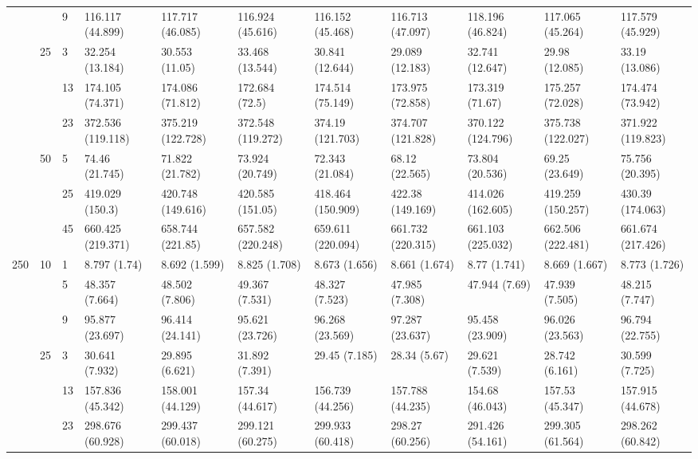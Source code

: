 \begin{tabular}{lllllllllll}
 &  & 9 & 116.117 (44.899) & 117.717 (46.085) & 116.924 (45.616) & 116.152 (45.468) & 116.713 (47.097) & 118.196 (46.824) & 117.065 (45.264) & 117.579 (45.929) \\
\cline{2-11}
 & \multirow[t]{3}{*}{25} & 3 & 32.254 (13.184) & 30.553 (11.05) & 33.468 (13.544) & 30.841 (12.644) & 29.089 (12.183) & 32.741 (12.647) & 29.98 (12.085) & 33.19 (13.086) \\
 &  & 13 & 174.105 (74.371) & 174.086 (71.812) & 172.684 (72.5) & 174.514 (75.149) & 173.975 (72.858) & 173.319 (71.67) & 175.257 (72.028) & 174.474 (73.942) \\
 &  & 23 & 372.536 (119.118) & 375.219 (122.728) & 372.548 (119.272) & 374.19 (121.703) & 374.707 (121.828) & 370.122 (124.796) & 375.738 (122.027) & 371.922 (119.823) \\
\cline{2-11}
 & \multirow[t]{3}{*}{50} & 5 & 74.46 (21.745) & 71.822 (21.782) & 73.924 (20.749) & 72.343 (21.084) & 68.12 (22.565) & 73.804 (20.536) & 69.25 (23.649) & 75.756 (20.395) \\
 &  & 25 & 419.029 (150.3) & 420.748 (149.616) & 420.585 (151.05) & 418.464 (150.909) & 422.38 (149.169) & 414.026 (162.605) & 419.259 (150.257) & 430.39 (174.063) \\
 &  & 45 & 660.425 (219.371) & 658.744 (221.85) & 657.582 (220.248) & 659.611 (220.094) & 661.732 (220.315) & 661.103 (225.032) & 662.506 (222.481) & 661.674 (217.426) \\
\cline{1-11} \cline{2-11}
\multirow[t]{9}{*}{250} & \multirow[t]{3}{*}{10} & 1 & 8.797 (1.74) & 8.692 (1.599) & 8.825 (1.708) & 8.673 (1.656) & 8.661 (1.674) & 8.77 (1.741) & 8.669 (1.667) & 8.773 (1.726) \\
 &  & 5 & 48.357 (7.664) & 48.502 (7.806) & 49.367 (7.531) & 48.327 (7.523) & 47.985 (7.308) & 47.944 (7.69) & 47.939 (7.505) & 48.215 (7.747) \\
 &  & 9 & 95.877 (23.697) & 96.414 (24.141) & 95.621 (23.726) & 96.268 (23.569) & 97.287 (23.637) & 95.458 (23.909) & 96.026 (23.563) & 96.794 (22.755) \\
\cline{2-11}
 & \multirow[t]{3}{*}{25} & 3 & 30.641 (7.932) & 29.895 (6.621) & 31.892 (7.391) & 29.45 (7.185) & 28.34 (5.67) & 29.621 (7.539) & 28.742 (6.161) & 30.599 (7.725) \\
 &  & 13 & 157.836 (45.342) & 158.001 (44.129) & 157.34 (44.617) & 156.739 (44.256) & 157.788 (44.235) & 154.68 (46.043) & 157.53 (45.347) & 157.915 (44.678) \\
 &  & 23 & 298.676 (60.928) & 299.437 (60.018) & 299.121 (60.275) & 299.933 (60.418) & 298.27 (60.256) & 291.426 (54.161) & 299.305 (61.564) & 298.262 (60.842) \\

\end{tabular}
